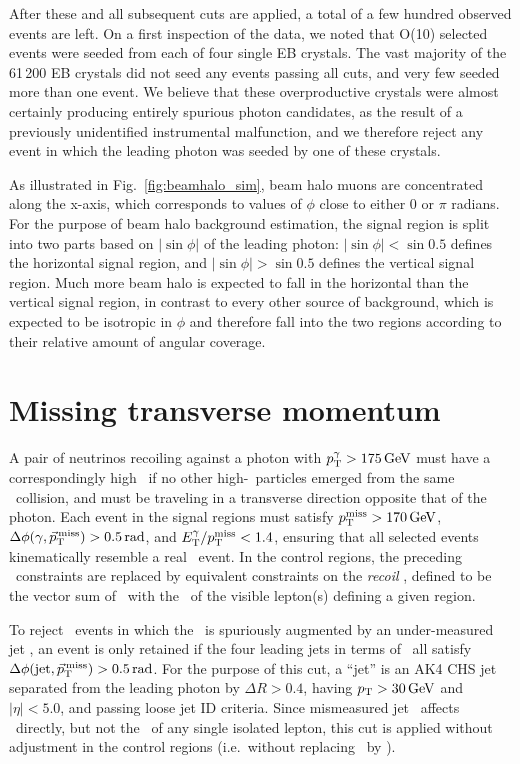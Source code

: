 After these and all subsequent cuts are applied, a total of a few hundred observed events are left. On a first inspection of the data, we noted that O(10) selected events
were seeded from each of four single EB crystals. The vast majority of the 61\,200 EB crystals did not seed any events passing all cuts, and very few seeded more than one event.
We believe that these overproductive crystals were almost certainly producing entirely spurious photon candidates, as the result of a previously unidentified
instrumental malfunction, and we therefore reject any event in which the leading photon was seeded by one of these crystals.

As illustrated in Fig.~\ref{fig:beamhalo_sim}, beam halo muons are concentrated along the x-axis, which corresponds to values of $\phi$ close to either 0 or $\pi$ radians.
For the purpose of beam halo background estimation, the signal region is split into two parts based on $|\sin{\phi}|$ of the leading photon: $|\sin{\phi}| < \sin{0.5}$ defines
the horizontal signal region, and $|\sin{\phi}| > \sin{0.5}$ defines the vertical signal region. Much more beam halo is expected to fall in the horizontal than the vertical
signal region, in contrast to every other source of background, which is expected to be isotropic in $\phi$ and therefore fall into the two regions according to their
relative amount of angular coverage.

\section{Missing transverse momentum} \label{sec:event_selection_MET}
A pair of neutrinos recoiling against a photon with $\pTgamma > 175\unit{GeV}$ must have a correspondingly high \pT\ if no other high-\pT\ particles emerged
from the same \Pp\Pp\ collision, and must be traveling in a transverse direction opposite that of the photon. Each event in the signal regions must satisfy
$\MET > 170\unit{GeV}$, $\Delta\phi(\Pgamma,\vecMET) > 0.5\unit{rad}$, and $\ETgamma/\MET < 1.4$, ensuring that all selected events kinematically resemble a real \zinvg\ event.
In the control regions, the preceding \vecMET\ constraints are replaced by equivalent constraints on the \textit{recoil} \vecrecoil, defined to be the vector sum of \vecMET\ with
the \vecpT\ of the visible lepton(s) defining a given region.

To reject \gjets\ events in which the \MET\ is spuriously augmented by an under-measured jet \pT,
an event is only retained if the four leading jets in terms of \pT\ all satisfy $\Delta\phi(\mathrm{jet},\vecMET) > 0.5\unit{rad}$.
For the purpose of this cut, a ``jet'' is an AK4 CHS jet separated from the leading photon by $\Delta R > 0.4$, having $\pT > 30\unit{GeV}$ and
$|\eta| < 5.0$, and passing loose jet ID criteria. Since mismeasured jet \vecpT\ affects \vecMET\ directly, but not the \vecpT\ of any single
isolated lepton, this cut is applied without adjustment in the control regions (i.e.\ without replacing \vecMET\ by \vecrecoil).

